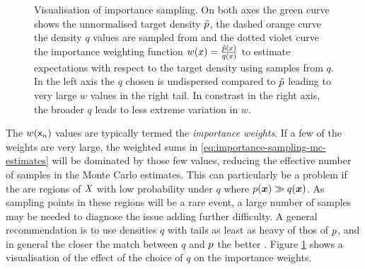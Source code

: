\begin{figure}[t]
\begin{subfigure}[b]{.48\linewidth}
\end{subfigure}
\caption[Visualisation of importance sampling.]{Visualisation of importance sampling. On both axes the green curve shows the unnormalised target density $\tilde{p}$, the dashed orange curve the density $q$ values are sampled from and the dotted violet curve the importance weighting function $w(x) = \frac{\tilde{p}(x)}{q(x)}$ to estimate expectations with respect to the target density using samples from $q$. In the left axis the $q$ chosen is undispersed compared to $\tilde{p}$ leading to very large $w$ values in the right tail. In constrast in the right axis, the broader $q$ leads to less extreme variation in $w$.}
\label{fig:importance-sampling}
\end{figure}

The $w(\mathsf{x}_n)$ values are typically termed the \emph{importance weights}. If a few of the weights are very large, the weighted sums in \eqref{eq:importance-sampling-mc-estimates} will be dominated by those few values, reducing the effective number of samples in the Monte Carlo estimates. This can particularly be a problem if the are regions of $\mathit{X}$ with low probability under $q$ where $p(\boldsymbol{x}) \gg q(\boldsymbol{x})$. As sampling points in these regions will be a rare event, a large number of samples may be needed to diagnose the issue adding further difficulty. A general recommendation is to use densities $q$ with tails as least as heavy of thos of $p$, and in general the closer the match between $q$ and $p$ the better \citep{mackay2003information,owen2013importance}. Figure \ref{fig:importance-sampling} shows a visualisation of the effect of the choice of $q$ on the importance weights.

